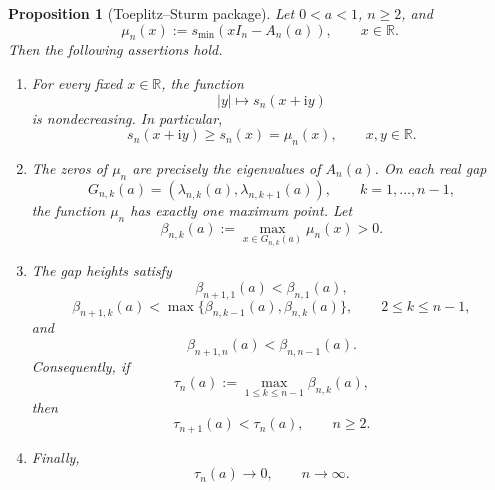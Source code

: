 \documentclass[11pt]{amsart}
\numberwithin{equation}{section}
\newcommand{\R}{\mathbb R}
\newcommand{\ii}{\mathrm i}
\newcommand{\A}{A}
\newtheorem{proposition}[theorem]{Proposition}
\begin{document}
\begin{proposition}[Toeplitz--Sturm package]\label{prop:sturm}
Let \(0<a<1\), \(n\ge2\), and
\[
\mu_n(x):=s_{\min}(xI_n-\A_n(a)),\qquad x\in\R.
\]
Then the following assertions hold.

\begin{enumerate}
\item For every fixed \(x\in\R\), the function
\[
|y|\longmapsto s_n(x+\ii y)
\]
is nondecreasing.  In particular,
\[
s_n(x+\ii y)\ge s_n(x)=\mu_n(x),
\qquad x,y\in\R.
\tag{3.1}\label{eq:vertical-monotonicity}
\]

\item The zeros of \(\mu_n\) are precisely the eigenvalues of \(\A_n(a)\).  On each real gap
\[
G_{n,k}(a)
=
(\lambda_{n,k}(a),\lambda_{n,k+1}(a)),
\qquad k=1,\dots,n-1,
\]
the function \(\mu_n\) has exactly one maximum point.  Let
\[
\beta_{n,k}(a)
:=
\max_{x\in G_{n,k}(a)}\mu_n(x)>0.
\tag{3.2}\label{eq:gap-height}
\]

\item The gap heights satisfy
\[
\beta_{n+1,1}(a)<\beta_{n,1}(a),
\tag{3.3a}\label{eq:height-left}
\]
\[
\beta_{n+1,k}(a)
<
\max\{\beta_{n,k-1}(a),\beta_{n,k}(a)\},
\qquad 2\le k\le n-1,
\tag{3.3b}\label{eq:height-middle}
\]
and
\[
\beta_{n+1,n}(a)<\beta_{n,n-1}(a).
\tag{3.3c}\label{eq:height-right}
\]
Consequently, if
\[
\tau_n(a):=\max_{1\le k\le n-1}\beta_{n,k}(a),
\tag{3.4}\label{eq:tau-def}
\]
then
\[
\tau_{n+1}(a)<\tau_n(a),\qquad n\ge2.
\tag{3.5}\label{eq:tau-monotone}
\]

\item Finally,
\[
\tau_n(a)\to0,\qquad n\to\infty.
\tag{3.6}\label{eq:tau-limit}
\]
\end{enumerate}
\end{proposition}
\end{document}
